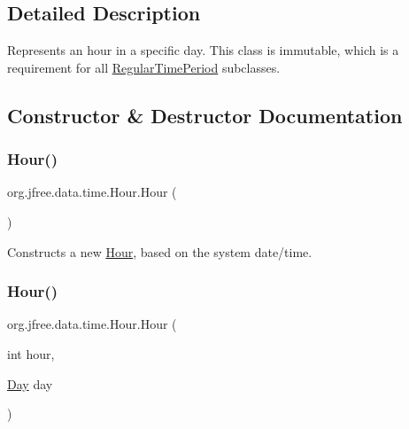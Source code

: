\subsection{Detailed Description}
Represents an hour in a specific day. This class is immutable, which is a requirement for all \mbox{\hyperlink{classorg_1_1jfree_1_1data_1_1time_1_1_regular_time_period}{Regular\+Time\+Period}} subclasses. 

\subsection{Constructor \& Destructor Documentation}
\mbox{\label{classorg_1_1jfree_1_1data_1_1time_1_1_hour_a60c6768390866620249b5709585143b3}} 
\subsubsection{\texorpdfstring{Hour()}{Hour()}\hspace{0.1cm}{\footnotesize\ttfamily [1/6]}}
{\footnotesize\ttfamily org.\+jfree.\+data.\+time.\+Hour.\+Hour (\begin{DoxyParamCaption}{ }\end{DoxyParamCaption})}

Constructs a new \mbox{\hyperlink{classorg_1_1jfree_1_1data_1_1time_1_1_hour}{Hour}}, based on the system date/time. \mbox{\label{classorg_1_1jfree_1_1data_1_1time_1_1_hour_a69787e94a0d8748388a8e0677e2ea0e0}} 
\subsubsection{\texorpdfstring{Hour()}{Hour()}\hspace{0.1cm}{\footnotesize\ttfamily [2/6]}}
{\footnotesize\ttfamily org.\+jfree.\+data.\+time.\+Hour.\+Hour (\begin{DoxyParamCaption}\item[{int}]{hour,  }\item[{\mbox{\hyperlink{classorg_1_1jfree_1_1data_1_1time_1_1_day}{Day}}}]{day }\end{DoxyParamCaption})}

